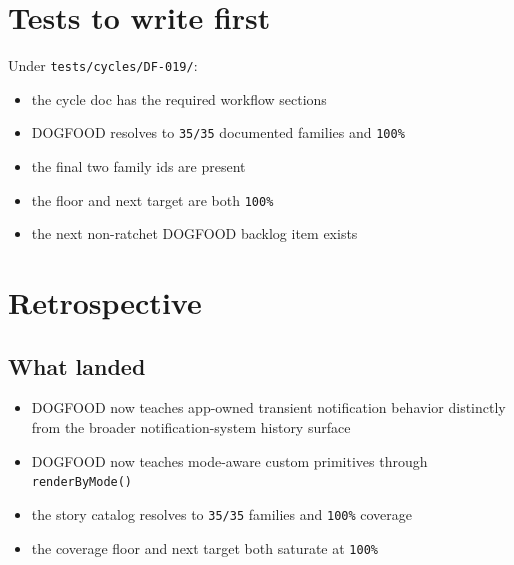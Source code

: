 \section{Tests to write first}\label{record-081-tests-to-write-first}

Under \texttt{t\allowbreak{}e\allowbreak{}s\allowbreak{}t\allowbreak{}s\allowbreak{}/\allowbreak{}c\allowbreak{}y\allowbreak{}c\allowbreak{}l\allowbreak{}e\allowbreak{}s\allowbreak{}/\allowbreak{}D\allowbreak{}F\allowbreak{}-\allowbreak{}0\allowbreak{}1\allowbreak{}9\allowbreak{}/}:

\begin{itemize}
\tightlist
\item
  the cycle doc has the required workflow sections
\item
  DOGFOOD resolves to \texttt{3\allowbreak{}5\allowbreak{}/\allowbreak{}3\allowbreak{}5} documented families and \texttt{1\allowbreak{}0\allowbreak{}0\allowbreak{}\%}
\item
  the final two family ids are present
\item
  the floor and next target are both \texttt{1\allowbreak{}0\allowbreak{}0\allowbreak{}\%}
\item
  the next non-ratchet DOGFOOD backlog item exists
\end{itemize}

\section{Retrospective}\label{record-081-retrospective}

\subsection{What landed}\label{record-081-what-landed}

\begin{itemize}
\tightlist
\item
  DOGFOOD now teaches app-owned transient notification behavior distinctly from the broader notification-system history surface
\item
  DOGFOOD now teaches mode-aware custom primitives through \texttt{r\allowbreak{}e\allowbreak{}n\allowbreak{}d\allowbreak{}e\allowbreak{}r\allowbreak{}B\allowbreak{}y\allowbreak{}M\allowbreak{}o\allowbreak{}d\allowbreak{}e\allowbreak{}(\allowbreak{})}
\item
  the story catalog resolves to \texttt{3\allowbreak{}5\allowbreak{}/\allowbreak{}3\allowbreak{}5} families and \texttt{1\allowbreak{}0\allowbreak{}0\allowbreak{}\%} coverage
\item
  the coverage floor and next target both saturate at \texttt{1\allowbreak{}0\allowbreak{}0\allowbreak{}\%}
\end{itemize}

